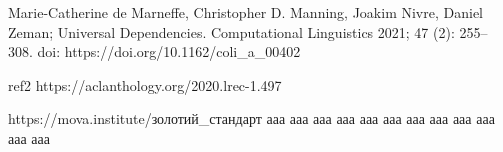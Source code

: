 \thispagestyle{empty}
\begin{thebibliography}{99}

{}

Marie-Catherine de Marneffe, Christopher D. Manning, Joakim Nivre, Daniel Zeman;
Universal Dependencies. Computational Linguistics 2021; 47 (2): 255–308. doi:
https://doi.org/10.1162/coli\_a\_00402

 ref2
https://aclanthology.org/2020.lrec-1.497

https://mova.institute/золотий\_стандарт
ааа
ааа
ааа
ааа
ааа
ааа
ааа
ааа
ааа
ааа
ааа
ааа

\end{thebibliography}